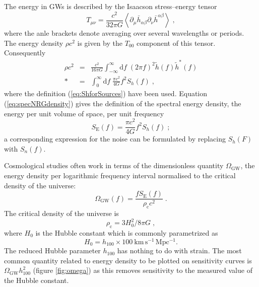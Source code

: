 The energy in GWs is described by the Isaacson stress--energy tensor \citep[section 35.15]{MTW}
\begin{equation}
T_{\mu\nu}=\frac{c^{2}}{32\pi G}\left<\partial_{\mu}\bar{h}_{\alpha\beta}\partial_{\nu}\bar{h}^{\alpha\beta}\right> \;,
\end{equation}
where the anle brackets denote averaging over several wavelengths or periods. The energy density $\rho c^{2}$ is given by the $T_{00}$ component of this tensor. Consequently
\begin{eqnarray}
\label{eq:specNRGdensity}
\rho c^{2} &=& \frac{c^{2}}{16\pi G}\int_{-\infty}^{\infty}\mathrm{d}f\;\left(2\pi f\right)^{2}\tilde{h}(f)\tilde{h}^{*}(f) \\*
 &=& \int_{0}^{\infty}\mathrm{d}f\;\frac{\pi c^{2}}{4G}f^{2}S_{h}(f)\; ,
\end{eqnarray} 
where the definition (\ref{eq:ShforSources}) have been used. Equation (\ref{eq:specNRGdensity}) gives the definition of the spectral energy density, the energy per unit volume of space, per unit frequency \citep{HellingsDowns}
\begin{equation}\label{eq:spectralenergydensity}
S_{\mathrm{E}}(f)=\frac{\pi c^{2}}{4G} f^{2}S_{h}(f) \; ;
\end{equation}
a corresponding expression for the noise can be formulated by replacing $S_h(F)$ with $S_{n}(f)$.

Cosmological studies often work in terms of the dimensionless quantity $\Omega_{\mathrm{GW}}$, the energy density per logarithmic frequency interval normalised to the critical density of the universe:
\begin{equation}
\label{eq:omega}
\Omega_\mathrm{GW}(f) = \frac{fS_{\mathrm{E}}(f)}{\rho_{\mathrm{c}}c^{2}} \; .
\end{equation}
The critical density of the universe is
\begin{equation}\label{eq:crit-density}
\rho_{\mathrm{c}}=3H_{0}^{2}/8\pi G \;,
\end{equation}
 where $H_{0}$ is the Hubble constant which is commonly parametrized as
\begin{equation}
H_0 =h_{100}\times 100~\mathrm{km\,s^{-1}\,Mpc^{-1}}.
\end{equation}
The reduced Hubble parameter $h_{100}$ has nothing to do with strain. The most common quantity related to energy density to be plotted on sensitivity curves is $\Omega_{\mathrm{GW}}h_{100}^{2}$ (figure \ref{fig:omega}) as this removes sensitivity to the measured value of the Hubble constant.


